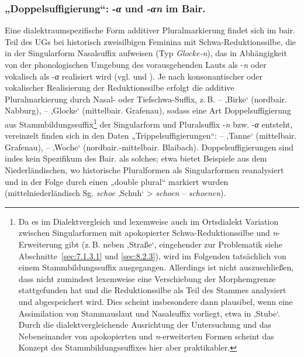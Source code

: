 \subsubsection{„Doppelsuffigierung“: -\textit{α} und -\textit{αn} im Bair.}
\label{sec:7.1.1.3}
Eine dialektraumspezifische Form additiver Pluralmarkierung findet sich im bair. Teil des UGs bei historisch zweisilbigen Feminina mit Schwa-Reduktionssilbe, die in der Singularform Nasalsuffix aufweisen (Typ \textit{Glocke-n}), das in Abhängigkeit von der phonologischen Umgebung des vorausgehenden Lauts als -\textit{n} oder vokalisch als -\textit{α} realisiert wird (vgl.  und 	). Je nach konsonantischer oder vokalischer Realisierung der Reduktionssilbe erfolgt die additive Pluralmarkierung durch Nasal- oder Tiefschwa-Suffix, z.\,B.  --  ‚Birke‘ (nordbair. Nabburg),  --  ‚Glocke‘ (mittelbair. Grafenau), sodass eine Art Doppelsuffigierung aus Stammbildungssuffix\footnote{Da es im Dialektvergleich und lexemweise auch im Ortsdialekt Variation zwischen Singularformen mit apokopierter Schwa-Reduktionssilbe und \textit{n}{}-Erweiterung gibt (z.\,B.  neben  ‚Straße‘, eingehender zur Problematik siehe Abschnitte~\ref{sec:7.1.3.1} und \ref{sec:8.2.3}), wird im Folgenden tatsächlich von einem Stammbildungssuffix ausgegangen. Allerdings ist nicht auszuschließen, dass nicht zumindest lexemweise eine Verschiebung der Morphemgrenze stattgefunden hat und die Reduktionssilbe als Teil des Stammes analysiert und abgespeichert wird. Dies scheint insbesondere dann plausibel, wenn eine Assimilation von Stammauslaut und Nasalsuffix vorliegt, etwa in  ‚Stube‘. Durch die dialektvergleichende Ausrichtung der Untersuchung und das Nebeneinander von apokopierten und \textit{n}{}-erweiterten Formen scheint das Konzept des Stammbildungssuffixes hier aber praktikabler.} der Singularform und Pluralsuffix -\textit{n} bzw. -\textit{α} entsteht, vereinzelt finden sich in den Daten „Trippelsuffigierungen“:   --  ‚Tanne‘ (mittelbair. Grafenau),  --  ‚Woche‘ (nordbair.-mittelbair. Blaibach). Doppelsuffigierungen sind indes kein Spezifikum des Bair. als solches; \citet[838]{Tiersma1982} etwa bietet Beispiele aus dem Niederländischen, wo historische Pluralformen als Singularformen reanalysiert und in der Folge durch einen „double plural“ markiert wurden (mittelniederländisch Sg. \textit{schoe} ‚Schuh‘ > \textit{schoen} -- \textit{schoenen}).

